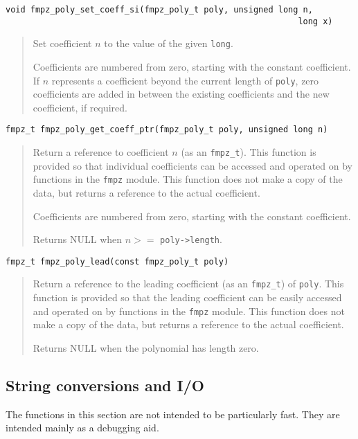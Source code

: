 \documentclass[a4paper,10pt]{article}
\newcommand{\code}{\lstinline}
\begin{document}
\begin{lstlisting}
void fmpz_poly_set_coeff_si(fmpz_poly_t poly, unsigned long n, 
                                                           long x) 
\end{lstlisting}
\begin{quote}
Set coefficient $n$ to the value of the given \code{long}. 

Coefficients are numbered from zero, starting with the constant coefficient. If $n$ represents a coefficient beyond the current length of \code{poly}, zero coefficients are added in between the existing coefficients and the new coefficient, if required.
\end{quote}

\begin{lstlisting}
fmpz_t fmpz_poly_get_coeff_ptr(fmpz_poly_t poly, unsigned long n)
\end{lstlisting}
\begin{quote}
Return a reference to coefficient $n$ (as an \code{fmpz_t}). This function is provided so that individual coefficients can be accessed and operated on by functions in the \code{fmpz} module. This function does not make a copy of the data, but returns a reference to the actual coefficient.

Coefficients are numbered from zero, starting with the constant coefficient. 

Returns NULL when $n >= $ \code{poly->length}. 
\end{quote}

\begin{lstlisting}
fmpz_t fmpz_poly_lead(const fmpz_poly_t poly)
\end{lstlisting}
\begin{quote}
Return a reference to the leading coefficient (as an \code{fmpz_t}) of \code{poly}. This function is provided so that the leading coefficient can be easily accessed and operated on by functions in the \code{fmpz} module. This function does not make a copy of the data, but returns a reference to the actual coefficient.

Returns NULL when the polynomial has length zero. 
\end{quote}

\subsection{String conversions and I/O}

The functions in this section are not intended to be particularly fast. They are intended mainly as a debugging aid.
\end{document}
